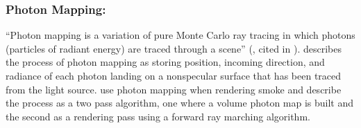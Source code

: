\subsubsection{Photon Mapping:}
“Photon mapping is a variation of pure Monte Carlo ray tracing in which photons (particles of radiant energy) are traced through a scene” (\citet{Jensen96}, cited in \citet{MHarris03}).
\citet{MHarris03} describes the process of photon mapping as storing position, incoming direction, and radiance of each photon landing on a nonspecular surface that has been traced from the light source.
\citet*{Fedkiw01} use photon mapping when rendering smoke and describe the process as a two pass algorithm, one where a volume photon map is built and the second as a rendering pass using a forward ray marching algorithm.